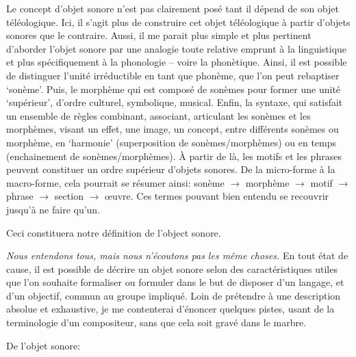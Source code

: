 \documentclass{article}
\begin{document}
Le concept d'objet sonore n'est pas clairement posé tant il dépend de son objet téléologique. Ici, il s'agit plus de construire cet objet téléologique à partir d'objets sonores que le contraire.   
Aussi, il me parait plus simple et plus pertinent d'aborder l'objet sonore par une analogie toute relative emprunt à la linguistique et plus spécifiquement à la phonologie -- voire la phonètique. Ainsi, il est possible de distinguer l'unité irréductible en tant que phonème, que l'on peut rebaptiser `sonème'. Puis, le morphème qui est composé de sonèmes pour former une unité `supérieur', d'ordre culturel, symbolique, musical. Enfin, la syntaxe, qui satisfait un ensemble de règles combinant, associant, articulant les sonèmes et les morphèmes, visant un effet, une image, un concept, entre différents sonèmes ou morphème, en `harmonie' (superposition de sonèmes/morphèmes) ou en temps (enchainement de sonèmes/morphèmes). À partir de là, les motifs et les phrases peuvent constituer un ordre supérieur d'objets sonores. De la micro-forme à la macro-forme, cela pourrait se résumer ainsi:
sonème $\rightarrow$ morphème $\rightarrow$ motif $\rightarrow$ phrase $\rightarrow$ section $\rightarrow$ œuvre. Ces termes pouvant bien entendu se recouvrir jusqu'à ne faire qu'un.

Ceci constituera notre définition de l'object sonore.
\bigskip

\textit
{Nous entendons tous, mais nous n'écoutons pas les même choses.}
En tout état de cause, il est possible de décrire un objet sonore selon des caractéristiques utiles que l'on souhaite formaliser ou formuler dans le but de disposer d'un langage, et d'un objectif, commun au groupe impliqué. Loin de prétendre à une description absolue et exhaustive, je me contenterai d'énoncer quelques pistes, usant de la terminologie d'un compositeur, sans que cela soit gravé dans le marbre. 
\bigskip

De l'objet sonore:
\end{document}
